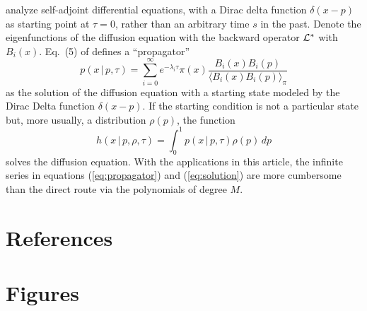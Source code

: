 \documentclass[preprint]{elsarticle}
\newcommand\given{{\,|\,}}
\newcommand\eg{{\it e.g.,}}
\begin{document}
\citet{Song12} analyze self-adjoint differential equations, with a Dirac delta function $\delta(x-p)$ as starting point at $\tau=0$, rather than an arbitrary time $s$ in the past. Denote the eigenfunctions of the diffusion equation with the backward operator $\cal{L}^*$ with $B_i(x)$. Eq.~(5) of \citet{Song12} defines a ``propagator'' \citep[][chap.~19]{Bayi06}
\begin{equation}\label{eq:propagator}
    p(x\given p,\tau)=\sum_{i=0}^\infty e^{-\lambda_i \tau}\pi(x) \frac{B_i(x)B_i(p)}{\langle B_i(x)B_i(p) \rangle_{\pi}}
\end{equation}
as the solution of the diffusion equation with a starting state modeled by the Dirac Delta function $\delta(x-p)$. If the starting condition is not a particular state but, more usually, a distribution $\rho(p)$, the function
\begin{equation}\label{eq:solution}
    h(x\given p,\rho,\tau)=\int_0^1 p(x\given p,\tau)\rho(p)\,dp
\end{equation}
solves the diffusion equation. With the applications in this article, the infinite series in equations (\ref{eq:propagator}) and (\ref{eq:solution}) are more cumbersome than the direct route via the polynomials of degree $M$. 



\section*{References}



\newpage

\section*{Figures}
\end{document}
